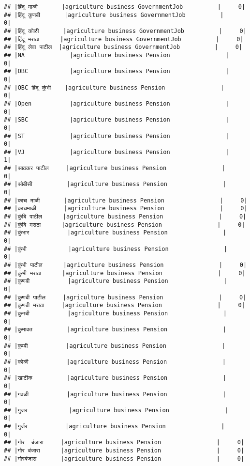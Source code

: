 \documentclass[
]{article}
\begin{document}
\begin{verbatim}
## |हिंदू-माळी       |agriculture business GovernmentJob          |     0|
## |हिंदू कुणबी       |agriculture business GovernmentJob          |     0|
## |हिंदू कोळी       |agriculture business GovernmentJob          |     0|
## |हिंदू मराठा      |agriculture business GovernmentJob          |     0|
## |हिंदू लेवा पाटील  |agriculture business GovernmentJob          |     0|
## |NA             |agriculture business Pension                |     0|
## |OBC            |agriculture business Pension                |     0|
## |OBC हिंदू कुंभी    |agriculture business Pension                |     0|
## |Open           |agriculture business Pension                |     0|
## |SBC            |agriculture business Pension                |     0|
## |ST             |agriculture business Pension                |     0|
## |VJ             |agriculture business Pension                |     1|
## |आठकर पाटील     |agriculture business Pension                |     0|
## |ओबीसी          |agriculture business Pension                |     0|
## |काच माळी       |agriculture business Pension                |     0|
## |काचमाळी        |agriculture business Pension                |     0|
## |कुंबि पाटील      |agriculture business Pension                |     0|
## |कुंबि मराठा      |agriculture business Pension                |     0|
## |कुंभार           |agriculture business Pension                |     0|
## |कुंभी            |agriculture business Pension                |     0|
## |कुंभी पाटील      |agriculture business Pension                |     0|
## |कुंभी मराठा      |agriculture business Pension                |     0|
## |कुणबी           |agriculture business Pension                |     0|
## |कुणबी पाटील     |agriculture business Pension                |     0|
## |कुणबी मराठा     |agriculture business Pension                |     0|
## |कुनबी           |agriculture business Pension                |     0|
## |कुमावत          |agriculture business Pension                |     0|
## |कुम्बी           |agriculture business Pension                |     0|
## |कोळी           |agriculture business Pension                |     0|
## |खाटीक          |agriculture business Pension                |     0|
## |गवळी           |agriculture business Pension                |     0|
## |गुजर            |agriculture business Pension                |     0|
## |गुर्जर           |agriculture business Pension                |     0|
## |गोर  बंजारा     |agriculture business Pension                |     0|
## |गोर बंजारा      |agriculture business Pension                |     0|
## |गोरबंजारा       |agriculture business Pension                |     0|

\end{verbatim}
\end{document}
